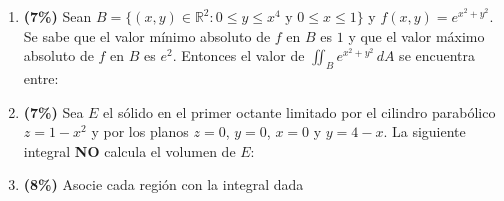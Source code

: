 \documentclass[11pt]{article}
\begin{document}
\begin{enumerate}
\begin{enumerate}
\item \textbf{(7\%)} Sean $B=\{(x,y)\in\mathbb{R}^2: 0\le y\le x^4 \text{ y } 0\le x\le 1\}$ y $f(x,y)=e^{x^2+y^2}$. Se sabe que el valor m\'inimo absoluto de $f$ en $B$ es $1$ y que el valor m\'aximo absoluto de $f$ en $B$ es $e^2$. Entonces el valor de $\iint_B e^{x^2+y^2}\,dA$ se encuentra entre:

\item \textbf{(7\%)} Sea $E$ el s\'olido en el primer octante limitado por el cilindro parab\'olico $z=1-x^2$ y por los planos $z=0$, $y=0$, $x=0$ y $y=4-x$. La siguiente integral \textbf{NO} calcula el volumen de $E$:

\item \textbf{(8\%)} Asocie cada regi\'on con la integral dada


\end{enumerate}
\end{enumerate}
\end{document}

